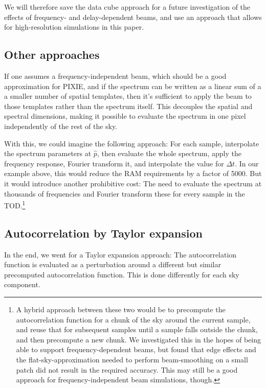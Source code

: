 \documentclass{article}
\begin{document}
We will therefore save the data cube approach for a future investigation of the
effects of frequency- and delay-dependent beams, and use an approach that
allows for high-resolution simulations in this paper.

\subsection{Other approaches}
If one assumes a frequency-independent beam, which should be a good approximation
for PIXIE, and if the spectrum can be written as a linear sum of a a smaller
number of spatial templates, then it's sufficient to apply the beam to those
templates rather than the spectrum itself. This
decouples the spatial and spectral dimensions, making it possible to evaluate the
spectrum in one pixel independently of the rest of the sky.

With this, we could
imagine the following approach: For each sample, interpolate the spectrum parameters
at $\hat p$, then evaluate the whole spectrum, apply the frequency response,
Fourier transform it,
and interpolate the value for $\Delta t$. In our example above, this would reduce
the RAM requirements by a factor of 5000. But it would introduce another prohibitive
cost: The need to evaluate the spectrum at thousands of frequencies and Fourier transform
these for every sample in the TOD.\footnote{
A hybrid approach between these two would be to precompute the autocorrelation function
for a chunk of the sky around the current sample, and reuse that for subsequent samples
until a sample falls outside the chunk, and then precompute a new chunk. We investigated
this in the hopes of being able to support frequency-dependent beams, but found that
edge effects and the flat-sky-approximation needed to perform beam-smoothing on a small
patch did not result in the required accuracy. This may still be a good approach for
frequency-independent beam simulations, though.}

\subsection{Autocorrelation by Taylor expansion}
In the end, we went for a Taylor expansion approach: The autocorrelation function
is evaluated as a perturbation around a different but similar
precomputed autocorrelation function. This is done differently for each sky component.
\end{document}
